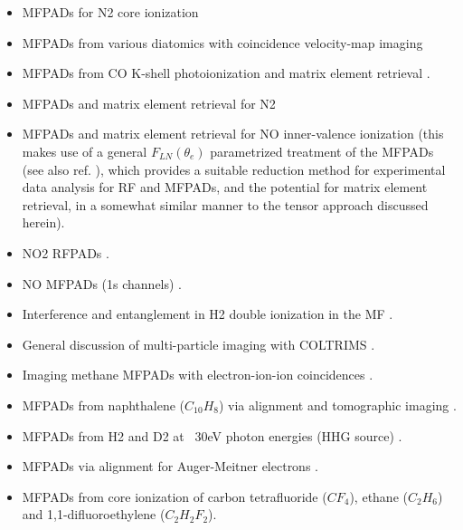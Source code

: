 \documentclass[10pt]{article}
\begin{document}
\begin{itemize}
\item MFPADs for N2 core ionization \cite{Shigemasa1995}
\item MFPADs from various diatomics with coincidence velocity-map imaging \cite{Eland2000} \cite{Hikosaka2000}
\item MFPADs from CO K-shell photoionization \cite{motoki2000KshellPhotoionizationCO} and matrix element retrieval \cite{Cherepkov2000}.
\item MFPADs and matrix element retrieval for N2 \cite{Gessner2002a}
\item MFPADs and matrix element retrieval for NO inner-valence ionization \cite{Lucchese2002,Lebech2003} (this makes use of a general $F_{LN}(\theta_e)$ parametrized treatment of the MFPADs (see also ref. \cite{Lafosse2002}), which provides a suitable reduction method for experimental data analysis for RF and MFPADs, and the potential for matrix element retrieval, in a somewhat similar manner to the tensor approach discussed herein). %
\item NO2 RFPADs \cite{Toffoli2007}.
\item NO MFPADs (1s channels) \cite{Li2007}.
\item Interference and entanglement in H2 double ionization in the MF \cite{Akoury2007}.
\item General discussion of multi-particle imaging with COLTRIMS \cite{Trinter2012a}.
\item Imaging methane MFPADs with electron-ion-ion coincidences \cite{Williams2012, Williams2012a}.
\item MFPADs from naphthalene ($C_{10}H_{8}$) via alignment and tomographic imaging \cite{Maurer2012}.
\item MFPADs from H2 and D2 at ~30eV photon energies (HHG source) \cite{Billaud2012a}.
\item MFPADs via alignment for Auger-Meitner electrons \cite{Cryan2010,Cryan2012a}.
\item MFPADs from core ionization of carbon tetrafluoride ($CF_4$), ethane ($C_2H_6$) and 1,1-difluoroethylene ($C_2 H_2 F_2$)\cite{Menssen2016}.
\end{itemize}
\end{document}
